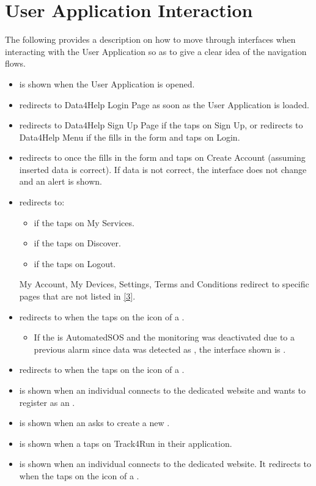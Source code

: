 \documentclass[../DD.tex]{subfiles}
\begin{document}
	\section{User Application Interaction}
	The following provides a description on how to move through interfaces when interacting with the User Application so as to give a clear idea of the navigation flows.
	\begin{itemize}
		\item {} is shown when the User Application is opened.
		\item {} redirects to Data4Help Login Page as soon as the User Application is loaded.
		\item {} redirects to Data4Help Sign Up Page if the  taps on Sign Up, or redirects to Data4Help Menu if the  fills in the form and taps on Login.
		\item {} redirects to  once the  fills in the form and taps on Create Account (assuming inserted data is correct). If data is not correct, the interface does not change and an alert is shown.
		\item {} redirects to:
			\begin{itemize}
				\item {} if the  taps on My Services.
				\item {} if the  taps on Discover.
				\item {} if the  taps on Logout.				
			\end{itemize}
			My Account, My Devices, Settings, Terms and Conditions redirect to specific pages that are not listed in \hyperref[ref:3]{[3]}. 
		\item {} redirects to  when the  taps on the icon of a .
			\begin{itemize}
				\item If the  is AutomatedSOS and the monitoring was deactivated due to a previous alarm since data was detected as , the interface shown is .
			\end{itemize}
		\item {} redirects to  when the  taps on the icon of a .
		\item {} is shown when an individual connects to the  dedicated website and wants to register as an .
		\item {} is shown when an  asks to create a new .
		\item {} is shown when a  taps on Track4Run in their application.
		\item {} is shown when an individual connects to the  dedicated website. It redirects to  when the  taps on the icon of a .
	\end{itemize}
\thispagestyle{fancy}
 
\end{document}
